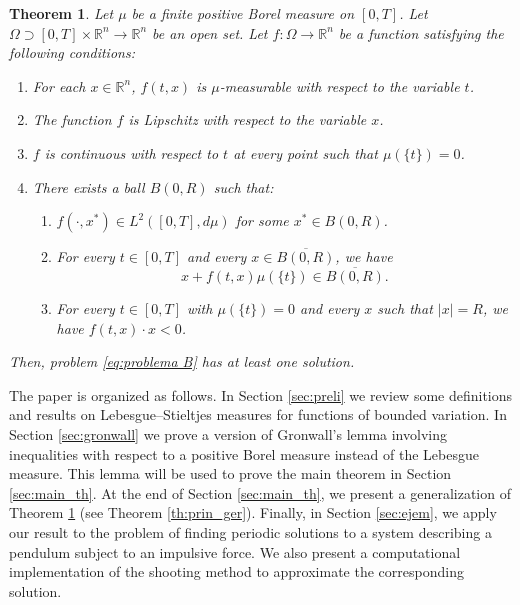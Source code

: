 \documentclass[a4paper,11pt]{amsart}
\theoremstyle{plain}
\newtheorem{thm}{Theorem}[section]
\theoremstyle{remark}
\newcommand{\rr}{\mathbb{R}}
\numberwithin{equation}{section}
\begin{document}
 \begin{thm} \label{th:final}
 	Let $\mu$ be a finite positive Borel measure on $[0,T]$. Let $\Omega\supset [0,T]\times\rr^n\to\rr^n$ be an open set. Let $f:\Omega \to\mathbb{R}^n$ be a function satisfying the following conditions:
    \begin{enumerate}[label=\upshape($H_{\arabic*}$),ref= ($H_{\arabic*}$)]
 	\item \label{pm1} For each $x\in\rr^n$, $f(t,x)$ is $\mu$-measurable with respect to the variable $t$.
     	\item \label{pm2} The function $f$ is Lipschitz with respect to the variable $x$.
\item \label{pm2.5} $f$ is continuous with respect to $t$ at every point such that $\mu(\{t\})=0$.

 \item There exists a ball $B(0, R)$ such that:
  \begin{enumerate}[label=\upshape($H_{\arabic{enumi}\arabic*}$),ref= ($H_{\arabic{enumi}\arabic*}$)]

		\item\label{eq:lp}  $f(\cdot,x^*)\in L^2([0,T],d\mu)$ for some  $x^*\in B(0,R)$.

        \item \label{eq:tele} For every $t \in [0,T]$ and every $x \in \overline{B(0,R)}$, we have $$x + f(t,x)\mu(\{t\}) \in \overline{B(0,R)}.$$

    \item \label{eq:tran} For every $t \in [0,T]$ with $\mu(\{t\}) = 0$ and every $x$ such that $|x| = R$, we have $f(t, x) \cdot x < 0$.
    \end{enumerate}
  \end{enumerate}
 	Then, problem \eqref{eq:problema B} has at least one solution. 
 
\end{thm}


The paper is organized as follows. In Section \ref{sec:preli} we review some definitions and results on Lebesgue--Stieltjes measures for functions of bounded variation. In Section \ref{sec:gronwall} we prove a version of Gronwall's lemma involving inequalities with respect to a positive Borel measure instead of the Lebesgue measure. This lemma will be used to prove the main theorem in Section \ref{sec:main_th}. At the end of Section \ref{sec:main_th}, we present a generalization of Theorem \ref{th:final} (see Theorem \ref{th:prin_ger}). Finally, in Section \ref{sec:ejem}, we apply our result to the problem of finding periodic solutions to a system describing a pendulum subject to an impulsive force. We also present a computational implementation of the shooting method to approximate the corresponding solution.
\end{document}
